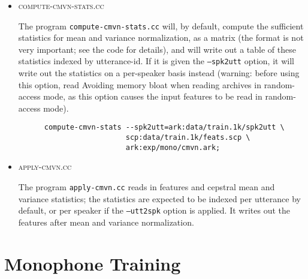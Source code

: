 \documentclass[10pt,a4paper]{article}
\begin{document}
\begin{itemize}
  \begin{itemize}
    \vspace{.25cm}
  \item \textsc{compute-cmvn-stats.cc}

    The program \texttt{compute-cmvn-stats.cc} will, by default, compute the sufficient statistics for mean and variance normalization, as a matrix (the format is not very important; see the code for details), and will write out a table of these statistics indexed by utterance-id. If it is given the \texttt{--spk2utt} option, it will write out the statistics on a per-speaker basis instead (warning: before using this option, read Avoiding memory bloat when reading archives in random-access mode, as this option causes the input features to be read in random-access mode).\\

    \begin{verbatim}
      compute-cmvn-stats --spk2utt=ark:data/train.1k/spk2utt \
                         scp:data/train.1k/feats.scp \
                         ark:exp/mono/cmvn.ark;
    \end{verbatim}


    \vspace{.25cm}
  \item \textsc{apply-cmvn.cc}

    The program \texttt{apply-cmvn.cc} reads in features and cepstral mean and variance statistics; the statistics are expected to be indexed per utterance by default, or per speaker if the \texttt{--utt2spk} option is applied. It writes out the features after mean and variance normalization. 

  \end{itemize}
\end{itemize}

\vspace{1cm}

\section*{\large{Monophone Training}}
\end{document}
